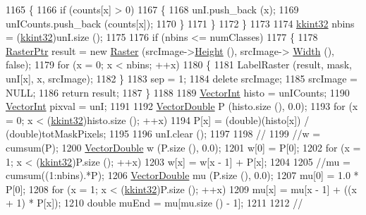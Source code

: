 \begin{DoxyCode}
1165     \{
1166       \textcolor{keywordflow}{if}  (counts[x] > 0)
1167       \{
1168         unI.push\_back (x);
1169         unICounts.push\_back (counts[x]);
1170       \}
1171     \}
1172   \}
1173 
1174   \hyperlink{namespace_k_k_b_a8fa4952cc84fda1de4bec1fbdd8d5b1b}{kkint32}  nbins = (\hyperlink{namespace_k_k_b_a8fa4952cc84fda1de4bec1fbdd8d5b1b}{kkint32})unI.size ();
1175 
1176   \textcolor{keywordflow}{if}  (nbins <= numClasses)
1177   \{
1178     \hyperlink{class_k_k_b_1_1_raster}{RasterPtr}  result = \textcolor{keyword}{new} \hyperlink{class_k_k_b_1_1_raster}{Raster} (srcImage->\hyperlink{class_k_k_b_1_1_raster_af8d10d15697d5b92fb9595c48b529feb}{Height} (), srcImage->
      \hyperlink{class_k_k_b_1_1_raster_aa2780c0b7ae75b7b595f99329689c1f6}{Width} (), \textcolor{keyword}{false});
1179     \textcolor{keywordflow}{for}  (x = 0;  x < nbins;  ++x)
1180     \{
1181       LabelRaster (result, mask, unI[x], x, srcImage);
1182     \}
1183     sep = 1;
1184     \textcolor{keyword}{delete}  srcImage;   
1185     srcImage = NULL;
1186     \textcolor{keywordflow}{return}  result;
1187   \}
1188 
1189   \hyperlink{namespace_k_k_b_a791ebe73f89917067a7aab9dbd817e45}{VectorInt}  histo  = unICounts;
1190   \hyperlink{namespace_k_k_b_a791ebe73f89917067a7aab9dbd817e45}{VectorInt}  pixval = unI;
1191 
1192   \hyperlink{namespace_k_k_b_a5906c207479607e5f450434095914a41}{VectorDouble}  P (histo.size (), 0.0);
1193   \textcolor{keywordflow}{for}  (x = 0;  x < (\hyperlink{namespace_k_k_b_a8fa4952cc84fda1de4bec1fbdd8d5b1b}{kkint32})histo.size ();  ++x)
1194     P[x] = (\textcolor{keywordtype}{double})(histo[x]) / (\textcolor{keywordtype}{double})totMaskPixels;
1195 
1196   unI.clear ();
1197 
1198   \textcolor{comment}{//%
1199   \textcolor{comment}{//w = cumsum(P);}
1200   \hyperlink{namespace_k_k_b_a5906c207479607e5f450434095914a41}{VectorDouble}  w (P.size (), 0.0);
1201   w[0] = P[0];
1202   \textcolor{keywordflow}{for}  (x = 1;  x < (\hyperlink{namespace_k_k_b_a8fa4952cc84fda1de4bec1fbdd8d5b1b}{kkint32})P.size (); ++x)
1203     w[x] = w[x - 1] + P[x];
1204 
1205   \textcolor{comment}{//mu = cumsum((1:nbins).*P);}
1206   \hyperlink{namespace_k_k_b_a5906c207479607e5f450434095914a41}{VectorDouble}  mu (P.size (), 0.0);
1207   mu[0] = 1.0 * P[0];
1208   \textcolor{keywordflow}{for}  (x = 1;  x < (\hyperlink{namespace_k_k_b_a8fa4952cc84fda1de4bec1fbdd8d5b1b}{kkint32})P.size ();  ++x)
1209     mu[x] = mu[x - 1] + ((x + 1) * P[x]);
1210   \textcolor{keywordtype}{double}  muEnd = mu[mu.size () - 1];
1211   
1212   \textcolor{comment}{//%
}}
\end{DoxyCode}
